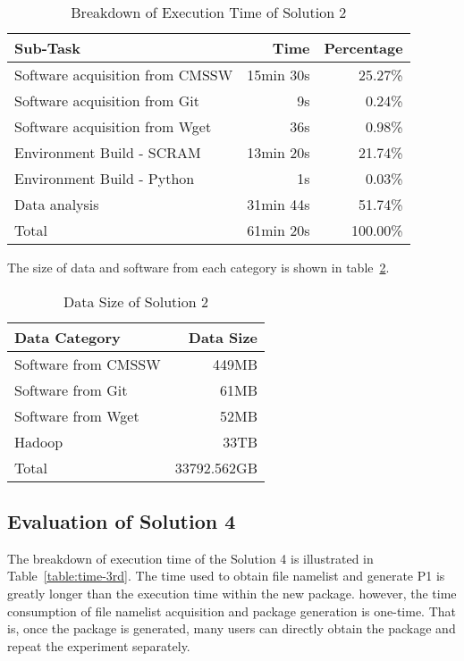 \documentclass{acm_proc_article-sp}
\begin{document}
\begin{table}
    \centering
    \begin{tabular}{|l|r|r|}
    \hline
    Sub-Task & Time & Percentage \\ \hline
    Software acquisition from CMSSW & 15min 30s & 25.27\% \\ \hline
    Software acquisition from Git & 9s & 0.24\% \\ \hline
    Software acquisition from Wget & 36s & 0.98\% \\ \hline
    Environment Build - SCRAM & 13min 20s & 21.74\% \\ \hline
    Environment Build - Python & 1s & 0.03\% \\ \hline
    Data analysis & 31min 44s & 51.74\% \\ \hline
    Total & 61min 20s & 100.00\% \\ \hline
    \end{tabular}
    \caption{Breakdown of Execution Time of Solution 2}
    \label{table:time-2nd}
\end{table}

The size of data and software from each category is shown in table~\ref{table:datasize-2nd}.

\begin{table}
    \centering
    \begin{tabular}{|l|r|}
    \hline
    Data Category & Data Size \\ \hline
    Software from CMSSW & 449MB \\ \hline
    Software from Git & 61MB \\ \hline
    Software from Wget & 52MB \\ \hline
    Hadoop & 33TB \\ \hline
    Total & 33792.562GB \\ \hline
    \end{tabular}
    \caption{Data Size of Solution 2}
    \label{table:datasize-2nd}
\end{table}

\subsection{Evaluation of Solution 4}
The breakdown of execution time of the Solution 4 is illustrated in Table~\ref{table:time-3rd}. The time used to obtain file namelist and generate P1 is greatly longer than the execution time within the new package. however, the time consumption of file namelist acquisition and package generation is one-time. That is, once the package is generated, many users can directly obtain the package and repeat the experiment separately. 
\end{document}
